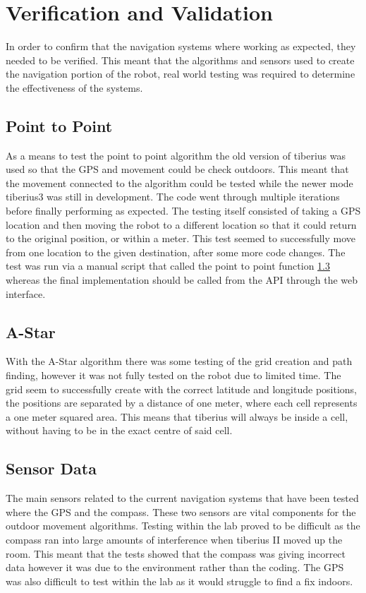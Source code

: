\section{Verification and Validation}
In order to confirm that the navigation systems where working as expected, they needed to be verified. This meant that the algorithms and sensors used to create the navigation portion of the robot, real world testing was required to determine the effectiveness of the systems.
\subsection{Point to Point}
As a means to test the point to point algorithm the old version of tiberius was used so that the \gls{GPS} and movement could be check outdoors. This meant that the movement connected to the algorithm could be tested while the newer mode \gls{tiberius3} was still in development. The code went through multiple iterations before finally performing as expected. The testing itself consisted of taking a \gls{GPS} location and then moving the robot to a different location so that it could return to the original position, or within a meter. This test seemed to successfully move from one location to the given destination, after some more code changes. The test was run via a manual script that called the point to point function \ref{} whereas the final implementation should be called from the API through the web interface.
\subsection{A-Star}
With the A-Star algorithm there was some testing of the grid creation and path finding, however it was not fully tested on the robot due to limited time. The grid seem to successfully create with the correct latitude and longitude positions, the positions are separated by a distance of one meter, where each cell represents a one meter squared area. This means that tiberius will always be inside a cell, without having to be in the exact centre of said cell.
\subsection{Sensor Data}
The main sensors related to the current navigation systems that have been tested where the \gls{GPS} and the compass. These two sensors are vital components for the outdoor movement algorithms. Testing within the lab proved to be difficult as the compass ran into large amounts of interference when tiberius II moved up the room. This meant that the tests showed that the compass was giving incorrect data however it was due to the environment rather than the coding. The \gls{GPS} was also difficult to test within the lab as it would struggle to find a fix indoors. 
